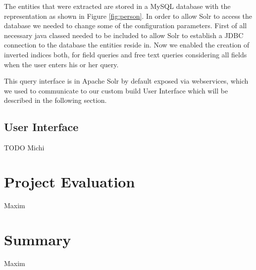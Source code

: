 \documentclass[11pt,titlepage,oneside,openany]{article}
\begin{document}
The entities that were extracted are stored in a MySQL database with the representation as shown in Figure \ref{fig:person}.  In order to allow Solr to access the database we needed to change some of the configuration parameters. First of all necessary java classed needed to be included to allow Solr to establish a JDBC connection to the database the entities reside in. Now we enabled the creation of inverted indices both, for field queries and free text queries considering all fields when the user enters his or her query. 

This query interface is in Apache Solr by default exposed via webservices, which we used to communicate to our custom build User Interface which will be described in the following section.
\subsection{User Interface}
TODO Michi
\section{Project Evaluation}
Maxim
\section{Summary}
Maxim
%
%





\newpage





\end{document}
